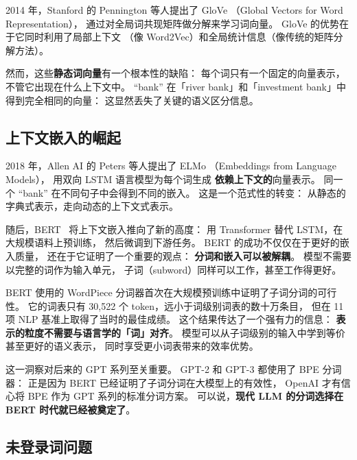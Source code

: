2014 年，Stanford 的 Pennington 等人提出了 GloVe
（Global Vectors for Word Representation），
通过对全局词共现矩阵做分解来学习词向量。
GloVe 的优势在于它同时利用了局部上下文
（像 Word2Vec）和全局统计信息（像传统的矩阵分解方法）。

然而，这些\textbf{静态词向量}有一个根本性的缺陷：
每个词只有一个固定的向量表示，
不管它出现在什么上下文中。
“bank” 在「river bank」和「investment bank」中
得到完全相同的向量：
这显然丢失了关键的语义区分信息。

\subsection{上下文嵌入的崛起}

2018 年，Allen AI 的 Peters 等人提出了 ELMo
（Embeddings from Language Models），
用双向 LSTM 语言模型为每个词生成
\textbf{依赖上下文的}向量表示。
同一个 “bank” 在不同句子中会得到不同的嵌入。
这是一个范式性的转变：
从静态的字典式表示，走向动态的上下文式表示。

随后，BERT~\cite{devlin2019bert} 将上下文嵌入推向了新的高度：
用 Transformer 替代 LSTM，在大规模语料上预训练，
然后微调到下游任务。
BERT 的成功不仅仅在于更好的嵌入质量，
还在于它证明了一个重要的观点：
\textbf{分词和嵌入可以被解耦}。
模型不需要以完整的词作为输入单元，
子词（subword）同样可以工作，甚至工作得更好。

BERT 使用的 WordPiece 分词器首次在大规模预训练中证明了子词分词的可行性。
它的词表只有 30,522 个 token，远小于词级别词表的数十万条目，
但在 11 项 NLP 基准上取得了当时的最佳成绩。
这个结果传达了一个强有力的信息：
\textbf{表示的粒度不需要与语言学的「词」对齐}。
模型可以从子词级别的输入中学到等价甚至更好的语义表示，
同时享受更小词表带来的效率优势。

这一洞察对后来的 GPT 系列至关重要。
GPT-2 和 GPT-3 都使用了 BPE 分词器：
正是因为 BERT 已经证明了子词分词在大模型上的有效性，
OpenAI 才有信心将 BPE 作为 GPT 系列的标准分词方案。
可以说，\textbf{现代 LLM 的分词选择在 BERT 时代就已经被奠定了}。

\subsection{未登录词问题}

